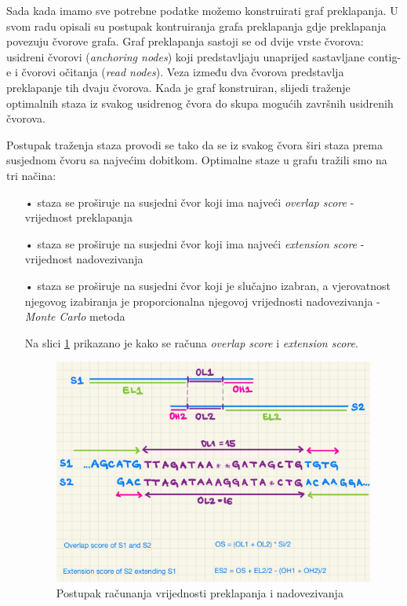 \documentclass[times, utf8, seminar]{fer}
\begin{document}
\begin{flushleft}
Sada kada imamo sve potrebne podatke možemo konstruirati graf preklapanja. U svom radu \cite{du2021assembly} opisali su postupak kontruiranja grafa preklapanja gdje preklapanja povezuju čvorove grafa. Graf preklapanja sastoji se od dvije vrste čvorova: usidreni čvorovi (\textit{anchoring nodes}) koji predstavljaju unaprijed sastavljane contig-e i čvorovi očitanja (\textit{read nodes}). Veza između dva čvorova predstavlja preklapanje tih dvaju čvorova. Kada je graf konstruiran, slijedi traženje optimalnih staza iz svakog usidrenog čvora do skupa mogućih završnih usidrenih čvorova.

Postupak traženja staza provodi se tako da se iz svakog čvora širi staza prema susjednom čvoru sa najvećim dobitkom. Optimalne staze u grafu tražili smo na tri načina:
\begin{itemize}
	\item[•]{staza se proširuje na susjedni čvor koji ima najveći \textit{overlap score} - vrijednost preklapanja}
	\item[•]{staza se proširuje na susjedni čvor koji ima najveći \textit{extension score} - vrijednost nadovezivanja}
	\item[•]{staza se proširuje na susjedni čvor koji je slučajno izabran, a vjerovatnost njegovog izabiranja je proporcionalna njegovoj vrijednosti nadovezivanja - \textit{Monte Carlo} metoda}

Na slici \ref{fig:scores} prikazano je kako se računa \textit{overlap score} i \textit{extension score}.

\begin{figure}[H]
  \centering
  \includegraphics[width=\textwidth]{scores.jpg}
  \caption{Postupak računanja vrijednosti preklapanja i nadovezivanja}
  \label{fig:scores}
\end{figure}

\end{itemize}
\end{flushleft}
\end{document}
